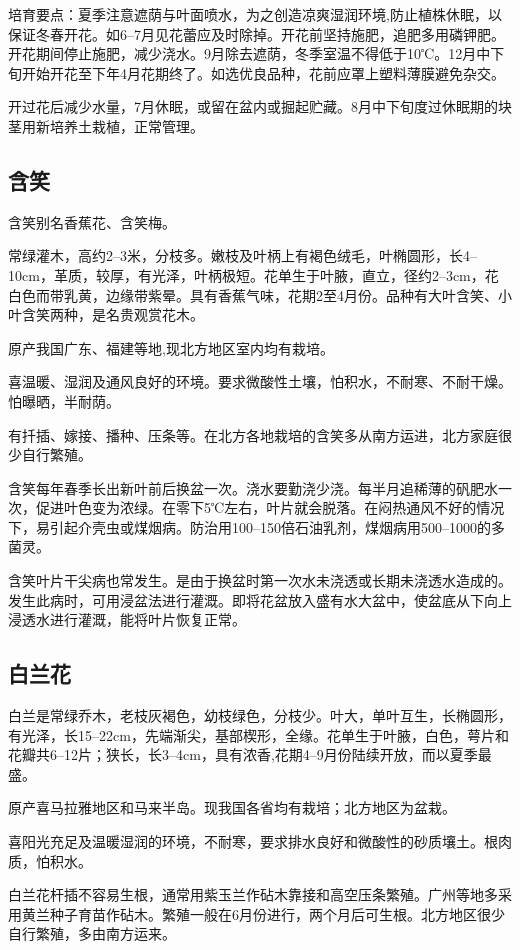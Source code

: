\documentclass{ctexbook}
\begin{document}
培育要点：夏季注意遮荫与叶面喷水，为之创造凉爽湿润环境,防止植株休眠，以保证冬春开花。如6--7月见花蕾应及时除掉。开花前坚持施肥，追肥多用磷钾肥。开花期间停止施肥，减少浇水。9月除去遮荫，冬季室温不得低于10℃。12月中下旬开始开花至下年4月花期终了。如选优良品种，花前应罩上塑料薄膜避免杂交。

开过花后减少水量，7月休眠，或留在盆内或掘起贮藏。8月中下旬度过休眠期的块茎用新培养土栽植，正常管理。
\subsection{含笑}
含笑别名香蕉花、含笑梅。

常绿灌木，高约2--3米，分枝多。嫩枝及叶柄上有褐色绒毛，叶椭圆形，长4--10cm，革质，较厚，有光泽，叶柄极短。花单生于叶腋，直立，径约2--3cm，花白色而带乳黄，边缘带紫晕。具有香蕉气味，花期2至4月份。品种有大叶含笑、小叶含笑两种，是名贵观赏花木。

原产我国广东、福建等地,现北方地区室内均有栽培。

喜温暖、湿润及通风良好的环境。要求微酸性土壤，怕积水，不耐寒、不耐干燥。怕曝晒，半耐荫。

有扦插、嫁接、播种、压条等。在北方各地栽培的含笑多从南方运进，北方家庭很少自行繁殖。

含笑每年春季长出新叶前后换盆一次。浇水要勤浇少浇。每半月追稀薄的矾肥水一次，促进叶色变为浓绿。在零下5℃左右，叶片就会脱落。在闷热通风不好的情况下，易引起介壳虫或煤烟病。防治用100--150倍石油乳剂，煤烟病用500--1000的多菌灵。

含笑叶片干尖病也常发生。是由于换盆时第一次水未浇透或长期未浇透水造成的。发生此病时，可用浸盆法进行灌溉。即将花盆放入盛有水大盆中，使盆底从下向上浸透水进行灌溉，能将叶片恢复正常。
\subsection{白兰花}
白兰是常绿乔木，老枝灰褐色，幼枝绿色，分枝少。叶大，单叶互生，长椭圆形，有光泽，长15--22cm，先端渐尖，基部楔形，全缘。花单生于叶腋，白色，萼片和花瓣共6--12片；狭长，长3--4cm，具有浓香,花期4--9月份陆续开放，而以夏季最盛。

原产喜马拉雅地区和马来半岛。现我国各省均有栽培；北方地区为盆栽。

喜阳光充足及温暖湿润的环境，不耐寒，要求排水良好和微酸性的砂质壤土。根肉质，怕积水。

白兰花杆插不容易生根，通常用紫玉兰作砧木靠接和高空压条繁殖。广州等地多采用黄兰种子育苗作砧木。繁殖一般在6月份进行，两个月后可生根。北方地区很少自行繁殖，多由南方运来。
\end{document}
